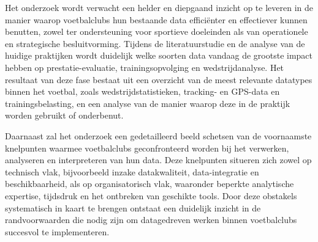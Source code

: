 






Het onderzoek wordt verwacht een helder en diepgaand inzicht op te leveren in de manier waarop voetbalclubs hun bestaande data efficiënter en effectiever kunnen benutten, zowel ter ondersteuning voor sportieve doeleinden als van operationele en strategische besluitvorming.
Tijdens de literatuurstudie en de analyse van de huidige praktijken wordt duidelijk welke soorten data vandaag de grootste impact hebben op prestatie-evaluatie, trainingsopvolging en wedstrijdanalyse.
Het resultaat van deze fase bestaat uit een overzicht van de meest relevante datatypes binnen het voetbal, zoals wedstrijdstatistieken, tracking- en GPS-data en trainingsbelasting, en een analyse van de manier waarop deze in de praktijk worden gebruikt of onderbenut.

Daarnaast zal het onderzoek een gedetailleerd beeld schetsen van de voornaamste knelpunten waarmee voetbalclubs geconfronteerd worden bij het verwerken, analyseren en interpreteren van hun data.
Deze knelpunten situeren zich zowel op technisch vlak, bijvoorbeeld inzake datakwaliteit, data-integratie en beschikbaarheid, als op organisatorisch vlak, waaronder beperkte analytische expertise, tijdsdruk en het ontbreken van geschikte tools.
Door deze obstakels systematisch in kaart te brengen ontstaat een duidelijk inzicht in de randvoorwaarden die nodig zijn om datagedreven werken binnen voetbalclubs succesvol te implementeren.

